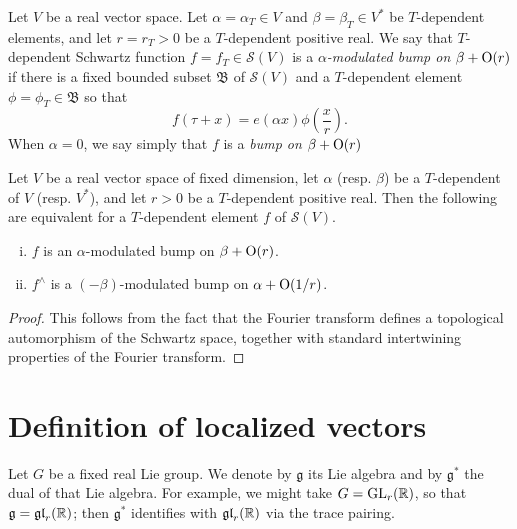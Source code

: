 \documentclass[reqno]{amsart} 
\numberwithin{equation}{section}
\numberwithin{theorem}{section}
\begin{document}
\begin{definition}
  Let $V$ be a real vector space.  Let $\alpha = \alpha_T \in V$ and $\beta = \beta_T \in V^*$ be $T$-dependent elements, and let $r = r_T > 0$ be a $T$-dependent positive real.  We say that $T$-dependent Schwartz function $f = f_T \in \mathcal{S}(V)$ is a $\alpha$\emph{-modulated bump on} $\beta + \operatorname{O}(r)$ if there is a fixed bounded subset $\mathfrak{B}$ of $\mathcal{S}(V)$ and a $T$-dependent element $\phi = \phi_T \in \mathfrak{B}$ so that
  \begin{equation*}
f(\tau + x) =  e(\alpha x) \phi\left( \frac{x }{r} \right).
\end{equation*}
When $\alpha = 0$, we say simply that $f$ is a \emph{bump on } $\beta + \operatorname{O}(r)$ 
\end{definition}

\begin{lemma}
  Let $V$ be a real vector space of fixed dimension, let $\alpha$ (resp. $\beta$) be a $T$-dependent of $V$ (resp. $V^*$), and let $r > 0$ be a $T$-dependent positive real.  Then the following are equivalent for a $T$-dependent element $f$ of $\mathcal{S}(V)$.
\begin{enumerate}[(i)]
\item $f$ is an  $\alpha$-modulated bump on $\beta + \operatorname{O}(r)$.  
\item $f^\wedge$ is a $(-\beta)$-modulated bump on $\alpha + \operatorname{O}(1/r)$.
\end{enumerate}  
\end{lemma}
\begin{proof}
This follows from the fact that the Fourier transform defines a topological automorphism of the Schwartz space, together with standard intertwining properties of the Fourier transform.
\end{proof}



\section{Definition of localized vectors}\label{sec:d1a8de614cc9}
Let $G$ be a fixed real Lie group.  We denote by $\mathfrak{g}$ its Lie algebra and by $\mathfrak{g}^*$ the dual of that Lie algebra.  For example, we might take $G = \operatorname{GL}_r(\mathbb{R})$, so that $\mathfrak{g} = \operatorname{\mathfrak{g}\mathfrak{l}}_r(\mathbb{R})$; then $\mathfrak{g}^*$ identifies with $\operatorname{\mathfrak{g}\mathfrak{l}}_r(\mathbb{R})$ via the trace pairing.
\end{document}
